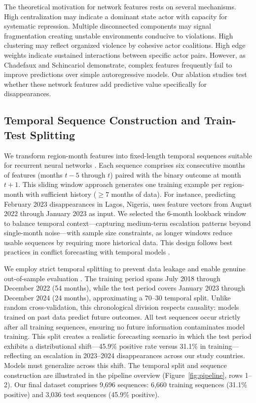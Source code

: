 \documentclass[pdflatex,sn-mathphys-num]{sn-jnl}%
\theoremstyle{thmstyleone}%
\theoremstyle{thmstyletwo}%
\theoremstyle{thmstylethree}%
\begin{document}
The theoretical motivation for network features rests on several mechanisms. High centralization may indicate a dominant state actor with capacity for systematic repression. Multiple disconnected components may signal fragmentation creating unstable environments conducive to violations. High clustering may reflect organized violence by cohesive actor coalitions. High edge weights indicate sustained interactions between specific actor pairs. However, as Chadefaux and Schincariol \cite{chadefaux2025endogenous} demonstrate, complex features frequently fail to improve predictions over simple autoregressive models. Our ablation studies test whether these network features add predictive value specifically for disappearances.

\subsection{Temporal Sequence Construction and Train-Test Splitting}

We transform region-month features into fixed-length temporal sequences suitable for recurrent neural networks \cite{beck2000improving}. Each sequence comprises six consecutive months of features (months $t{-}5$ through $t$) paired with the binary outcome at month $t{+}1$. This sliding window approach generates one training example per region-month with sufficient history ($\geq 7$ months of data). For instance, predicting February 2023 disappearances in Lagos, Nigeria, uses feature vectors from August 2022 through January 2023 as input. We selected the 6-month lookback window to balance temporal context---capturing medium-term escalation patterns beyond single-month noise---with sample size constraints, as longer windows reduce usable sequences by requiring more historical data. This design follows best practices in conflict forecasting with temporal models \cite{malone2022recurrent, radford2022high}.

We employ strict temporal splitting to prevent data leakage and enable genuine out-of-sample evaluation \cite{hegre2017conflict}. The training period spans July 2018 through December 2022 (54 months), while the test period covers January 2023 through December 2024 (24 months), approximating a 70--30 temporal split. Unlike random cross-validation, this chronological division respects causality: models trained on past data predict future outcomes. All test sequences occur strictly after all training sequences, ensuring no future information contaminates model training. This split creates a realistic forecasting scenario in which the test period exhibits a distributional shift---45.9\% positive rate versus 31.1\% in training---reflecting an escalation in 2023--2024 disappearances across our study countries. Models must generalize across this shift. The temporal split and sequence construction are illustrated in the pipeline overview (Figure~\ref{fig:pipeline}, rows 1--2). Our final dataset comprises 9,696 sequences: 6,660 training sequences (31.1\% positive) and 3,036 test sequences (45.9\% positive).
\end{document}
